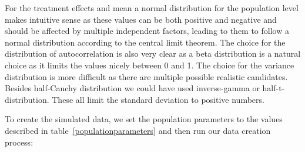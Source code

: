 \documentclass[12pt,a4paper,leqno]{report}
\theoremstyle{plain}
\theoremstyle{definition}
\theoremstyle{remark}
\begin{document}

For the treatment effects and mean a normal distribution for the population level makes
intuitive sense as these values can be both positive and negative and should be affected
by multiple independent factors, leading to them to follow a normal distribution
according to the central limit theorem. The choice for the distribution of
autocorrelation is also very clear as a beta distribution is a natural choice as it
limits the values nicely between 0 and 1. The choice for the variance distribution is
more difficult as there are multiple possible realistic candidates. Besides half-Cauchy
distribution we could have used inverse-gamma or half-t-distribution. These all limit
the standard deviation to positive numbers.


To create the simulated data, we set the population parameters to the values described
in table\ \ref{populationparameters} and then run
our data creation process:
\end{document}
